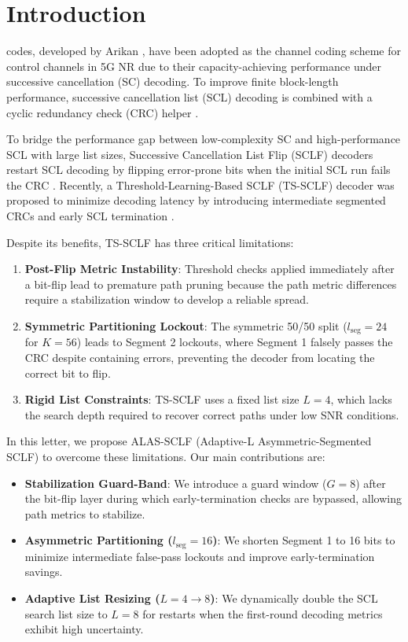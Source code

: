 \documentclass[journal,twocolumn]{IEEEtran}
\begin{document}
\section{Introduction}
 codes, developed by Arikan \cite{arikan2009}, have been adopted as the channel coding scheme for control channels in 5G NR due to their capacity-achieving performance under successive cancellation (SC) decoding. To improve finite block-length performance, successive cancellation list (SCL) decoding is combined with a cyclic redundancy check (CRC) helper \cite{tal2015}. 

To bridge the performance gap between low-complexity SC and high-performance SCL with large list sizes, Successive Cancellation List Flip (SCLF) decoders restart SCL decoding by flipping error-prone bits when the initial SCL run fails the CRC \cite{afisiadis2014, chandesris2016}. Recently, a Threshold-Learning-Based SCLF (TS-SCLF) decoder was proposed to minimize decoding latency by introducing intermediate segmented CRCs and early SCL termination \cite{sun2026}.

Despite its benefits, TS-SCLF has three critical limitations:
\begin{enumerate}
    \item \textbf{Post-Flip Metric Instability}: Threshold checks applied immediately after a bit-flip lead to premature path pruning because the path metric differences require a stabilization window to develop a reliable spread.
    \item \textbf{Symmetric Partitioning Lockout}: The symmetric 50/50 split ($l_{\text{seg}}=24$ for $K=56$) leads to Segment 2 lockouts, where Segment 1 falsely passes the CRC despite containing errors, preventing the decoder from locating the correct bit to flip.
    \item \textbf{Rigid List Constraints}: TS-SCLF uses a fixed list size $L=4$, which lacks the search depth required to recover correct paths under low SNR conditions.
\end{enumerate}

In this letter, we propose ALAS-SCLF (Adaptive-L Asymmetric-Segmented SCLF) to overcome these limitations. Our main contributions are:
\begin{itemize}
    \item \textbf{Stabilization Guard-Band}: We introduce a guard window ($G=8$) after the bit-flip layer during which early-termination checks are bypassed, allowing path metrics to stabilize.
    \item \textbf{Asymmetric Partitioning ($l_{\text{seg}}=16$)}: We shorten Segment 1 to 16 bits to minimize intermediate false-pass lockouts and improve early-termination savings.
    \item \textbf{Adaptive List Resizing ($L=4\rightarrow 8$)}: We dynamically double the SCL search list size to $L=8$ for restarts when the first-round decoding metrics exhibit high uncertainty.
\end{itemize}
\end{document}
